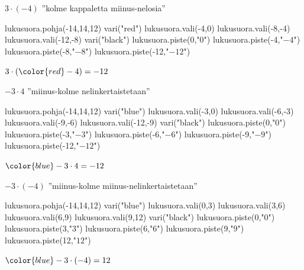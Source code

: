     $3 \cdot (-4)$ ''kolme kappaletta miinus-nelosia''
    
    
\begin{center}
\begin{kuva}
	lukusuora.pohja(-14,14,12)
	vari("red")
	lukusuora.vali(-4,0)
	lukusuora.vali(-8,-4)
	lukusuora.vali(-12,-8)
	vari("black")
	lukusuora.piste(0,"$0$")
	lukusuora.piste(-4,"$-4$")
	lukusuora.piste(-8,"$-8$")
	lukusuora.piste(-12,"$-12$")
\end{kuva}
%
      $3\cdot ({\color{red}-4})=-12$
\end{center}
    
    $-3 \cdot 4$ ''miinus-kolme nelinkertaistetaan''
    
\begin{center}
\begin{kuva}
	lukusuora.pohja(-14,14,12)
	vari("blue")
	lukusuora.vali(-3,0)
	lukusuora.vali(-6,-3)
	lukusuora.vali(-9,-6)
	lukusuora.vali(-12,-9)
	vari("black")
	lukusuora.piste(0,"$0$")
	lukusuora.piste(-3,"$-3$")
	lukusuora.piste(-6,"$-6$")
	lukusuora.piste(-9,"$-9$")
	lukusuora.piste(-12,"$-12$")
\end{kuva}
%
      ${\color{blue}-3}\cdot 4=-12$
\end{center}
    
    $-3 \cdot (-4)$ ''miinus-kolme miinus-nelinkertaistetaan''
    
\begin{center}
\begin{kuva}
	lukusuora.pohja(-14,14,12)
	vari("blue")
	lukusuora.vali(0,3)
	lukusuora.vali(3,6)
	lukusuora.vali(6,9)
	lukusuora.vali(9,12)
	vari("black")
	lukusuora.piste(0,"$0$")
	lukusuora.piste(3,"$3$")
	lukusuora.piste(6,"$6$")
	lukusuora.piste(9,"$9$")
	lukusuora.piste(12,"$12$")
\end{kuva}
%
      ${\color{blue}-3}\cdot (-4)=12$
\end{center}

